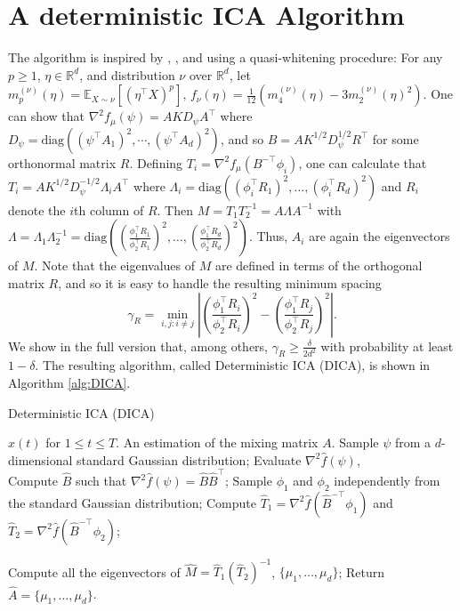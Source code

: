 \documentclass{article} %
\newcommand{\real}{\mathbb{R}}
\newcommand{\E}{\mathbb{E}}
\theoremstyle{definition}
\begin{document}
\section{A deterministic ICA Algorithm}
\label{sec:DICA}
The algorithm is inspired by \citet{hsu2013learning}, \citet{arora2012provable}, and \citet{frieze1996learning} using a quasi-whitening procedure:
For any $p\ge 1$, $\eta\in \real^d$, and distribution $\nu$ over $\real^d$,
let 
$m_p^{(\nu)}(\eta) = \E_{X\sim \nu}[ (\eta^\top X)^p ],\, f_{\nu}(\eta) = \tfrac1{12} \left( m_4^{(\nu)}(\eta) - 3 m_2^{(\nu)}(\eta)^2 \right)$.
One can show that $\nabla^2 f_\mu(\psi)=A K D_{\psi} A^\top$ where $D_{\psi} =\text{diag}\left((\psi^{\top}A_1)^2,\cdots, (\psi^{\top}A_d)^2\right)$,
and so $B= AK^{1/2}D_{\psi}^{1/2}R^{\top}$ for some orthonormal matrix $R$. Defining $T_i=\nabla^2 f_\mu(B^{-\top} \phi_i)$, one can calculate that
$T_i=A K^{1/2} D_\psi^{-1/2} \Lambda_i A^\top$ where $\Lambda_i =\text{diag}\left( (\phi_i^\top R_1)^2,\ldots,(\phi_i^\top R_d)^2 \right)$ and $R_i$ denote the $i$th column of $R$.
Then $M=T_1 T_2^{-1} = A\Lambda A^{-1}$ with $\Lambda=\Lambda_1 \Lambda_2^{-1}=\text{diag}\left( \left(\frac{\phi_1^\top R_1}{\phi_2^\top R_1}\right)^2,\ldots,\left(\frac{\phi_1^\top R_d}{\phi_2^\top R_d}\right)^2 \right)$. Thus, $A_i$ are again the eigenvectors of $M$.
Note that the eigenvalues of $M$ are defined in terms of the orthogonal matrix $R$,
and so it is easy to handle the resulting minimum spacing
\vspace{-3mm}
\begin{equation}
\label{def:gammaR}
\gamma_R =  \min_{i,j: i\neq j} \left\vert \left(\frac{\phi_1^{\top}R_i}{\phi_2^{\top}R_i}\right)^2 - \left(\frac{\phi_1^{\top}R_j}{\phi_2^{\top}R_j}\right)^2 \right\vert.
\end{equation}
We show in the full version \citep{HuGySz15} %
that, among others,  $\gamma_R \ge\frac{\delta}{2d^2}$ with probability at least $1-\delta$.
The resulting algorithm, called Deterministic ICA (DICA), is shown in Algorithm \ref{alg:DICA}. 
\begin{algorithm}
\caption{Deterministic ICA (DICA)}
\label{alg:DICA}
\begin{algorithmic}[1]
\INPUT $x(t)$ for $1\le t \le T$. 
\OUTPUT An estimation of the mixing matrix $A$. 
\STATE Sample $\psi$ from a $d$-dimensional standard Gaussian distribution;
\STATE Evaluate $\nabla^2\hat{f}(\psi)$, \\
\STATE Compute $\hat{B}$ such that $\nabla^2\hat{f}(\psi) = \hat{B}\hat{B}^{\top}$;
\STATE Sample $\phi_1$ and $\phi_2$ independently from the standard Gaussian distribution;
\STATE Compute $\hat{T}_1 =\nabla^2\hat{f}(\hat{B}^{-\top}\phi_1)$ and  $\hat{T}_2 =\nabla^2\hat{f}(\hat{B}^{-\top}\phi_2)$;

\STATE Compute all the eigenvectors of $\hat{M} = \hat{T}_1\left(\hat{T}_2\right)^{-1}$, $\{\mu_1,\ldots,\mu_d\}$;
\STATE Return $\hat{A} = \{\mu_1,\ldots,\mu_d\}$.
\end{algorithmic}
\end{algorithm}





\end{document}
